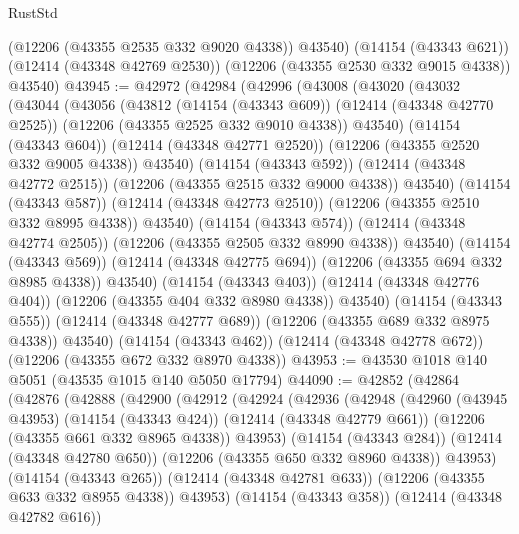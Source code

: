 \begin{lexlean}{RustStd}
\begin{coremodule}
{\begin{coremodule}
{{{{{{{{{{{{{{{{{{{{{{{{{{{{{{{{{{{{{{{{{{{{{{{{{{        (@12206 (@43355 @2535 @332 @9020 @4338))
        @43540)
      (@14154 (@43343 @621))
      (@12414 (@43348 @42769 @2530))
      (@12206 (@43355 @2530 @332 @9015 @4338))
      @43540)
@43945 := @42972
    (@42984
      (@42996
        (@43008
          (@43020
            (@43032
              (@43044
                (@43056
                  (@43812
                    (@14154 (@43343 @609))
                    (@12414 (@43348 @42770 @2525))
                    (@12206 (@43355 @2525 @332 @9010 @4338))
                    @43540)
                  (@14154 (@43343 @604))
                  (@12414 (@43348 @42771 @2520))
                  (@12206 (@43355 @2520 @332 @9005 @4338))
                  @43540)
                (@14154 (@43343 @592))
                (@12414 (@43348 @42772 @2515))
                (@12206 (@43355 @2515 @332 @9000 @4338))
                @43540)
              (@14154 (@43343 @587))
              (@12414 (@43348 @42773 @2510))
              (@12206 (@43355 @2510 @332 @8995 @4338))
              @43540)
            (@14154 (@43343 @574))
            (@12414 (@43348 @42774 @2505))
            (@12206 (@43355 @2505 @332 @8990 @4338))
            @43540)
          (@14154 (@43343 @569))
          (@12414 (@43348 @42775 @694))
          (@12206 (@43355 @694 @332 @8985 @4338))
          @43540)
        (@14154 (@43343 @403))
        (@12414 (@43348 @42776 @404))
        (@12206 (@43355 @404 @332 @8980 @4338))
        @43540)
      (@14154 (@43343 @555))
      (@12414 (@43348 @42777 @689))
      (@12206 (@43355 @689 @332 @8975 @4338))
      @43540)
    (@14154 (@43343 @462))
    (@12414 (@43348 @42778 @672))
    (@12206 (@43355 @672 @332 @8970 @4338))
@43953 := @43530 @1018 @140 @5051 (@43535 @1015 @140 @5050 @17794)
@44090 := @42852
    (@42864
      (@42876
        (@42888
          (@42900
            (@42912
              (@42924
                (@42936
                  (@42948
                    (@42960
                      (@43945 @43953)
                      (@14154 (@43343 @424))
                      (@12414 (@43348 @42779 @661))
                      (@12206 (@43355 @661 @332 @8965 @4338))
                      @43953)
                    (@14154 (@43343 @284))
                    (@12414 (@43348 @42780 @650))
                    (@12206 (@43355 @650 @332 @8960 @4338))
                    @43953)
                  (@14154 (@43343 @265))
                  (@12414 (@43348 @42781 @633))
                  (@12206 (@43355 @633 @332 @8955 @4338))
                  @43953)
                (@14154 (@43343 @358))
                (@12414 (@43348 @42782 @616))
}}}}}}}}}}}}}}}}}}}}}}}}}}}}}}}}}}}}}}}}}}}}}}}}}}
\end{coremodule}}
\end{coremodule}
\end{lexlean}
